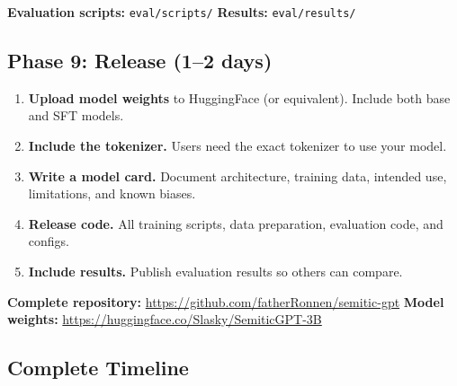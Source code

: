 \documentclass[11pt,a4paper]{article}
\begin{document}
\begin{reporef}
\textbf{Evaluation scripts:} \texttt{eval/scripts/}\hfill
\textbf{Results:} \texttt{eval/results/}
\end{reporef}

\subsection{Phase 9: Release (1--2 days)}

\begin{enumerate}
    \item \textbf{Upload model weights} to HuggingFace (or equivalent). Include both base and SFT models.
    
    \item \textbf{Include the tokenizer.} Users need the exact tokenizer to use your model.
    
    \item \textbf{Write a model card.} Document architecture, training data, intended use, limitations, and known biases.
    
    \item \textbf{Release code.} All training scripts, data preparation, evaluation code, and configs.
    
    \item \textbf{Include results.} Publish evaluation results so others can compare.
\end{enumerate}

\begin{reporef}
\textbf{Complete repository:} \url{https://github.com/fatherRonnen/semitic-gpt}\hfill
\textbf{Model weights:} \url{https://huggingface.co/Slasky/SemiticGPT-3B}
\end{reporef}

\subsection{Complete Timeline}
\end{document}
